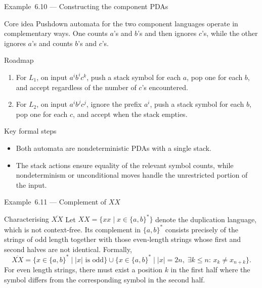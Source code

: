 \begin{frame}[t]{Example 6.10 — Constructing the component PDAs}
  \begin{tblock}{Core idea}
    Pushdown automata for the two component languages operate in
    complementary ways.  One counts $a$’s and $b$’s and then ignores
    $c$’s, while the other ignores $a$’s and counts $b$’s and $c$’s.
  \end{tblock}
  \begin{tblock}{Roadmap}
    \begin{enumerate}
      \item For $L_1$, on input $a^i b^i c^k$, push a stack symbol for
        each $a$, pop one for each $b$, and accept regardless of the
        number of $c$’s encountered.
      \item For $L_2$, on input $a^i b^j c^j$, ignore the prefix
        $a^i$, push a stack symbol for each $b$, pop one for each $c$, and
        accept when the stack empties.
    \end{enumerate}
  \end{tblock}
  \begin{tblock}{Key formal steps}
    \begin{itemize}
      \item Both automata are nondeterministic PDAs with a single stack.
      \item The stack actions ensure equality of the relevant symbol
        counts, while nondeterminism or unconditional moves handle the
        unrestricted portion of the input.
    \end{itemize}
  \end{tblock}
  \label{fr:6.2-04}
\end{frame}

\begin{frame}[t]{Example 6.11 — Complement of $XX$}
  \begin{texample}{Characterising $\overline{XX}$}
    Let $XX = \{xx \mid x \in \{a,b\}^*\}$ denote the duplication language,
    which is not context‑free.  Its complement in $\{a,b\}^*$ consists
    precisely of the strings of odd length together with those even‑length
    strings whose first and second halves are not identical.  Formally,
    \[
      \overline{XX}
      = \{x \in \{a,b\}^* \mid |x| \text{ is odd}\}
        \cup \{x \in \{a,b\}^* \mid |x| = 2n,\; \exists k \le n:\, x_k \ne x_{n+k}\}.
    \]
    For even length strings, there must exist a position $k$ in the first
    half where the symbol differs from the corresponding symbol in the
    second half.
  \end{texample}
  \label{fr:6.2-05}
\end{frame}

